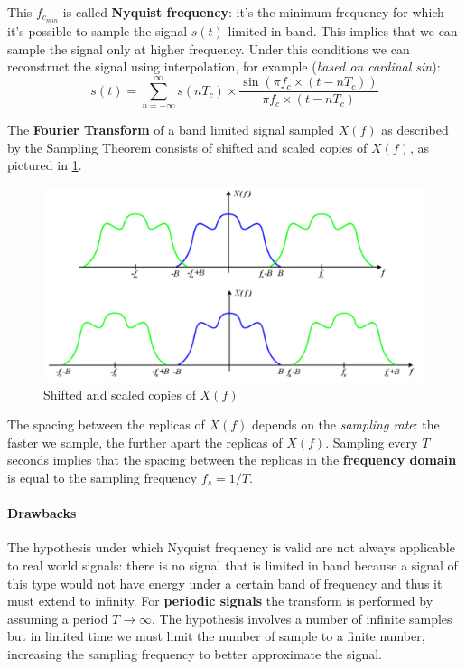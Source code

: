 \documentclass[10pt,a4paper]{report}
\theoremstyle{definition}
\begin{document}
This $f_{c_{min}}$ is called \textbf{Nyquist frequency}: it's the minimum frequency for which it's possible to sample the signal $s(t)$ limited in band. This implies that we can sample the signal only at higher frequency. Under this conditions we can reconstruct the signal using interpolation, for example (\textit{based on cardinal sin}):
\begin{equation}
	s(t)=\sum_{n=-\infty}^{\infty} s(nT_{c}) \times \frac{\sin(\pi f_{c} \times (t-nT_{c}))}{\pi f_{c} \times (t-nT_{c})}
\end{equation}



The \textbf{Fourier Transform} of a band limited signal sampled $X(f)$ as described by the Sampling Theorem consists of shifted and scaled copies of $X(f)$, as pictured in \ref{ft-shifting-spectrum}.
\begin{figure}[h!]
	\centering\includegraphics[scale=0.50]{images/Pasted image 20230526114412.png}
	\caption{Shifted and scaled copies of $X(f)$}
	\label{ft-shifting-spectrum}
\end{figure}

The spacing between the replicas of $X(f)$ depends on the \textit{sampling rate}: the faster we sample, the further apart the replicas of $X(f)$. Sampling every $T$ seconds implies that the spacing between the replicas in the \textbf{frequency domain} is equal to the sampling frequency $f_{s} = 1/T$.
\paragraph{Drawbacks}\label{sec:drawbacks}
The hypothesis under which Nyquist frequency is valid are not always applicable to real world signals: there is no signal that is limited in band because a signal of this type would not have energy under a certain band of frequency and thus it must extend to infinity.
For \textbf{periodic signals} the transform is performed by assuming a period $T \rightarrow \infty$.
The hypothesis involves a number of infinite samples but in limited time we must limit the number of sample to a finite number, increasing the sampling frequency to better approximate the signal.
\end{document}
